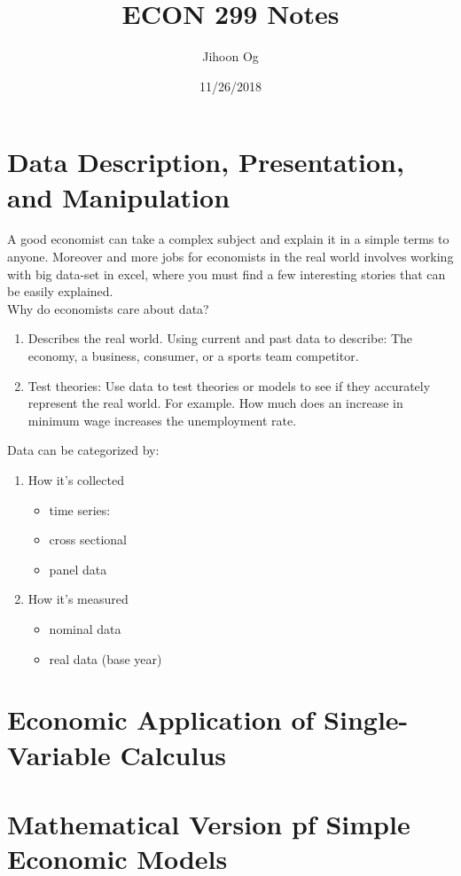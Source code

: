 \documentclass{book}
\title{ECON 299 Notes}
\author{Jihoon Og}
\date{11/26/2018}
\begin{document}
\frontmatter
\maketitle 
\tableofcontents
\mainmatter
\chapter{Data Description, Presentation, and Manipulation}
A good economist can take a complex subject and explain it in a simple terms to anyone. Moreover and more jobs for economists in the real world involves working with big data-set in excel, where you must find a few interesting stories that can be easily explained.\\
Why do economists care about data?\\

\begin{enumerate}
    \item Describes the real world. Using current and past data to describe: The economy, a business, consumer, or a sports team competitor.
    \item Test theories: Use data to test theories or models to see if they accurately represent the real world. For example. How much does an increase in minimum wage increases the unemployment rate.
\end{enumerate}

Data can be categorized by:
\begin{enumerate}
    \item How it's collected
    \begin{itemize}
        \item time series: 
        \item cross sectional
        \item panel data
    \end{itemize}
    \item How it's measured
    \begin{itemize}
        \item nominal data
        \item real data (base year)
    \end{itemize}
\end{enumerate}
\chapter{Economic Application of Single-Variable Calculus}
\chapter{Mathematical Version pf Simple Economic Models}
\end{document}
